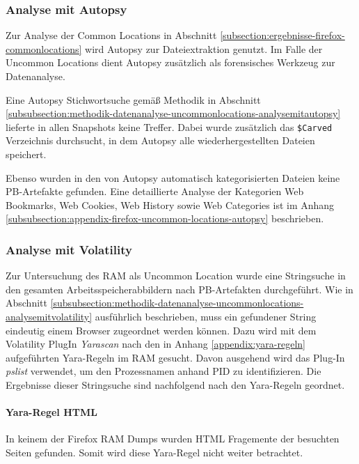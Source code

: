\subsubsection*{Analyse mit Autopsy}
\label{subsubsection:ergebnisse-firefox-uncommonlocations-analysemitautopsy}
Zur Analyse der Common Locations in Abschnitt \ref{subsection:ergebnisse-firefox-commonlocations} wird Autopsy zur Dateiextraktion genutzt. Im Falle der Uncommon Locations dient Autopsy zusätzlich als forensisches Werkzeug zur Datenanalyse.

Eine Autopsy Stichwortsuche gemäß Methodik in Abschnitt \ref{subsubsection:methodik-datenanalyse-uncommonlocations-analysemitautopsy} lieferte in allen Snapshots keine Treffer. Dabei wurde zusätzlich das \texttt{\$Carved} Verzeichnis durchsucht, in dem Autopsy alle wiederhergestellten Dateien speichert.

Ebenso wurden in den von Autopsy automatisch kategorisierten Dateien keine PB-Artefakte gefunden. Eine detaillierte Analyse der Kategorien \glqq{}Web Bookmarks\grqq{}, \glqq{}Web Cookies\grqq{}, \glqq{}Web History\grqq{} sowie \glqq{}Web Categories\grqq{} ist im Anhang \ref{subsubsection:appendix-firefox-uncommon-locations-autopsy} beschrieben.

\subsubsection*{Analyse mit Volatility}
\label{subsubsection:ergebnisse-firefox-uncommonlocations-analysemitvolatility}
Zur Untersuchung des RAM als Uncommon Location wurde eine Stringsuche in den gesamten Arbeitsspeicherabbildern nach PB-Artefakten durchgeführt.
Wie in Abschnitt \ref{subsubsection:methodik-datenanalyse-uncommonlocations-analysemitvolatility} ausführlich beschrieben, muss ein gefundener String eindeutig einem Browser zugeordnet werden können. 
Dazu wird mit dem Volatility PlugIn \textit{Yarascan} nach den in Anhang \ref{appendix:yara-regeln} aufgeführten Yara-Regeln im RAM gesucht. Davon ausgehend wird das Plug-In \textit{pslist} verwendet, um den Prozessnamen anhand PID zu identifizieren.
Die Ergebnisse dieser Stringsuche sind nachfolgend nach den Yara-Regeln geordnet.

\paragraph*{Yara-Regel \glqq{}HTML\grqq{}}
In keinem der Firefox RAM Dumps wurden HTML Fragemente der besuchten Seiten gefunden. Somit wird diese Yara-Regel nicht weiter betrachtet.

